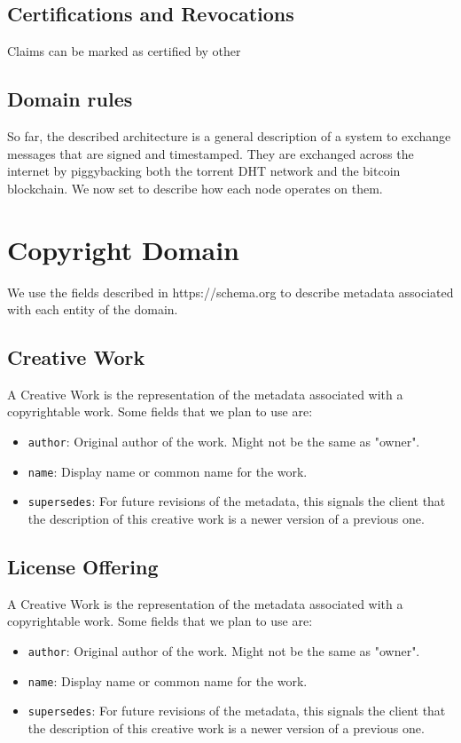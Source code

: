 \documentclass[12pt]{article}
\begin{document}
\subsection{Certifications and Revocations}

Claims can be marked as certified by other 

\subsection{Domain rules}

So far, the described architecture is a general description of a system to exchange messages that are signed and timestamped. They are exchanged across the internet by piggybacking both the torrent DHT network and the bitcoin blockchain. We now set to describe how each node operates on them. 

\section{Copyright Domain}

We use the fields described in https://schema.org to describe metadata associated with each entity of the domain.

\subsection{Creative Work}

A Creative Work is the representation of the metadata associated with a copyrightable work. Some fields that we plan to use are:
\begin{itemize}
  \item \texttt{author}: Original author of the work. Might not be the same as "owner".
  \item \texttt{name}: Display name or common name for the work.
  \item \texttt{supersedes}: For future revisions of the metadata, this signals the client that the description of this creative work is a newer version of a previous one.
\end{itemize}

\subsection{License Offering}

A Creative Work is the representation of the metadata associated with a copyrightable work. Some fields that we plan to use are:
\begin{itemize}
  \item \texttt{author}: Original author of the work. Might not be the same as "owner".
  \item \texttt{name}: Display name or common name for the work.
  \item \texttt{supersedes}: For future revisions of the metadata, this signals the client that the description of this creative work is a newer version of a previous one.
\end{itemize}
\end{document}
